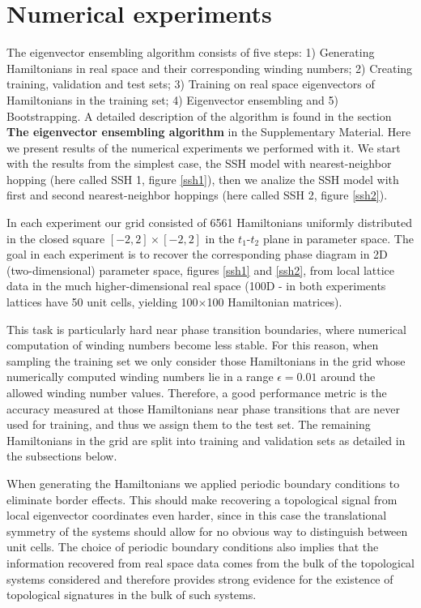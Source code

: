 \documentclass[fleqn,10pt]{wlscirep}
\begin{document}
\section*{Numerical experiments}

The eigenvector ensembling algorithm consists of five steps: 1) Generating Hamiltonians in real space and their corresponding winding numbers; 2) Creating training, validation and test sets; 3) Training on real space eigenvectors of Hamiltonians in the training set; 4) Eigenvector ensembling and 5) Bootstrapping. A detailed description of the algorithm is found in the section \textbf{The eigenvector ensembling algorithm} in the Supplementary Material. Here we present results of the numerical experiments we performed with it. We start with the results from the simplest case, the SSH model with nearest-neighbor hopping (here called SSH 1, figure \ref{ssh1}), then we analize the SSH model with first and second nearest-neighbor hoppings (here called SSH 2, figure \ref{ssh2}).

In each experiment our grid consisted of 6561 Hamiltonians uniformly distributed in the closed square $[-2,2]\times[-2,2]$ in the $t_1$-$t_2$ plane in parameter space. The goal in each experiment is to recover the corresponding phase diagram in 2D (two-dimensional) parameter space, figures \ref{ssh1} and \ref{ssh2}, from local lattice data in the much higher-dimensional real space (100D - in both experiments lattices have 50 unit cells, yielding 100$\times$100 Hamiltonian matrices).

This task is particularly hard near phase transition boundaries, where numerical computation of winding numbers become less stable. For this reason, when sampling the training set we only consider those Hamiltonians in the grid whose numerically computed winding numbers lie in a range $\epsilon = 0.01$ around the allowed winding number values. Therefore, a good performance metric is the accuracy measured at those Hamiltonians near phase transitions that are never used for training, and thus we assign them to the test set. The remaining Hamiltonians in the grid are split into training and validation sets as detailed in the subsections below.

When generating the Hamiltonians we applied periodic boundary conditions to eliminate border effects. This should make recovering a topological signal from local eigenvector coordinates even harder, since in this case the translational symmetry of the systems should allow for no obvious way to distinguish between unit cells. The choice of periodic boundary conditions also implies that the information recovered from real space data comes from the bulk of the topological systems considered and therefore provides strong evidence for the existence of topological signatures in the bulk of such systems. 
\end{document}
